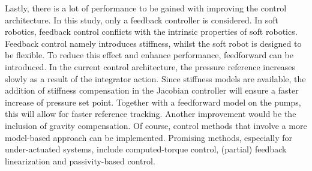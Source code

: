 Lastly, there is a lot of performance to be gained with improving the control architecture. In this study, only a feedback controller is considered. In soft robotics, feedback control conflicts with the intrinsic properties of soft robotics. Feedback control namely introduces stiffness, whilst the soft robot is designed to be flexible. To reduce this effect and enhance performance, feedforward can be introduced. In the current control architecture, the pressure reference increases slowly as a result of the integrator action. Since stiffness models are available, the addition of stiffness compensation in the Jacobian controller will ensure a faster increase of pressure set point. Together with a feedforward model on the pumps, this will allow for faster reference tracking. Another improvement would be the inclusion of gravity compensation. Of course, control methods that involve a more model-based approach can be implemented. Promising methods, especially for under-actuated systems, include computed-torque control, (partial) feedback linearization and passivity-based control.  
